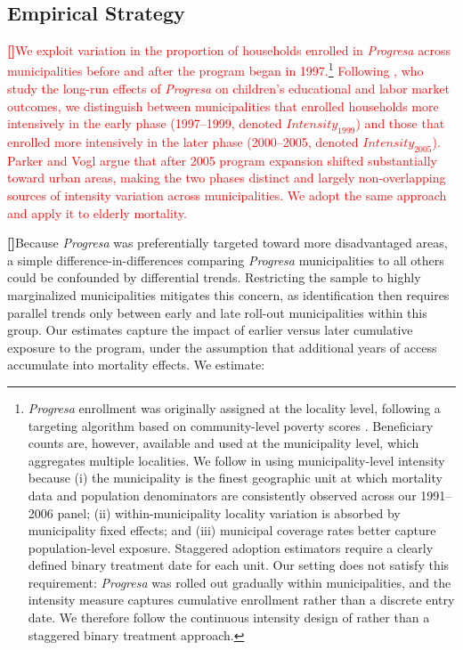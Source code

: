 \documentclass[12pt]{article}
\newcounter{paragraphnum}
\newcommand{\p}{\refstepcounter{paragraphnum}\textbf{[\theparagraphnum]}\enspace}
\begin{document}
\subsection{Empirical Strategy}\label{subsec:empirical_strategy}

\textcolor{red}{\p We exploit variation in the proportion of households enrolled in \textit{Progresa} across municipalities before and after the program began in 1997.\footnote{\textit{Progresa} enrollment was originally assigned at the locality level, following a targeting algorithm based on community-level poverty scores \citep{ParkerTodd2017JEL}. Beneficiary counts are, however, available and used at the municipality level, which aggregates multiple localities. We follow \cite{parker2023conditional} in using municipality-level intensity because (i) the municipality is the finest geographic unit at which mortality data and population denominators are consistently observed across our 1991--2006 panel; (ii) within-municipality locality variation is absorbed by municipality fixed effects; and (iii) municipal coverage rates better capture population-level exposure. Staggered adoption estimators \citep{callaway2021difference, sun2021estimating, de2020two} require a clearly defined binary treatment date for each unit. Our setting does not satisfy this requirement: \textit{Progresa} was rolled out gradually within municipalities, and the intensity measure captures cumulative enrollment rather than a discrete entry date. We therefore follow the continuous intensity design of \cite{parker2023conditional} rather than a staggered binary treatment approach.} Following \cite{parker2023conditional}, who study the long-run effects of \textit{Progresa} on children's educational and labor market outcomes, we distinguish between municipalities that enrolled households more intensively in the early phase (1997--1999, denoted $\textit{Intensity}_{1999}$) and those that enrolled more intensively in the later phase (2000--2005, denoted $\textit{Intensity}_{2005}$). Parker and Vogl argue that after 2005 program expansion shifted substantially toward urban areas, making the two phases distinct and largely non-overlapping sources of intensity variation across municipalities. We adopt the same approach and apply it to elderly mortality.}

\p Because \textit{Progresa} was preferentially targeted toward more disadvantaged areas, a simple difference-in-differences comparing \textit{Progresa} municipalities to all others could be confounded by differential trends. Restricting the sample to highly marginalized municipalities mitigates this concern, as identification then requires parallel trends only between early and late roll-out municipalities within this group. Our estimates capture the impact of earlier versus later cumulative exposure to the program, under the assumption that additional years of access accumulate into mortality effects. We estimate:
\end{document}
